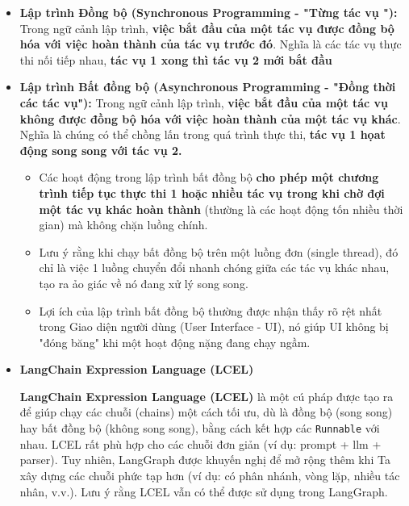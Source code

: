 \documentclass[11pt]{article}
\begin{document}
\begin{itemize}
\begin{boxC}
        \begin{itemize}
            \item \textbf{Lập trình Đồng bộ (Synchronous Programming - "Từng tác vụ "):} Trong ngữ cảnh lập trình, \textbf{việc bắt đầu của một tác vụ được đồng bộ hóa với việc hoàn thành của tác vụ trước đó}. Nghĩa là các tác vụ thực thi nối tiếp nhau,  \textbf{tác vụ 1 xong thì tác vụ 2 mới bắt đầu}

            \item \textbf{Lập trình Bất đồng bộ (Asynchronous Programming - "Đồng thời các tác vụ"):} Trong ngữ cảnh lập trình, \textbf{việc bắt đầu của một tác vụ không được đồng bộ hóa với việc hoàn thành của một tác vụ khác}. Nghĩa là chúng có thể chồng lấn trong quá trình thực thi, \textbf{tác vụ 1 họat động song song với tác vụ 2.}
            \begin{itemize}
                \item Các hoạt động trong lập trình bất đồng bộ \textbf{cho phép một chương trình tiếp tục thực thi 1 hoặc nhiều tác vụ trong khi chờ đợi một tác vụ khác hoàn thành} (thường là các hoạt động tốn nhiều thời gian) mà không chặn luồng chính.
                \item Lưu ý rằng khi chạy bất đồng bộ trên một luồng đơn (single thread), đó chỉ là việc 1 luồng chuyển đổi nhanh chóng giữa các tác vụ khác nhau, tạo ra ảo giác về nó đang xử lý song song.
                \item Lợi ích của lập trình bất đồng bộ thường được nhận thấy rõ rệt nhất trong Giao diện người dùng (User Interface - UI), nó giúp UI không bị "đóng băng" khi một hoạt động nặng đang chạy ngầm.
            \end{itemize}

	\item \textbf{LangChain Expression Language (LCEL)}
	\begin{boxC}
		\textbf{LangChain Expression Language (LCEL)} là một cú pháp được tạo ra để giúp chạy các chuỗi (chains) một cách tối ưu, dù là đồng bộ (song song) hay bất đồng bộ (không song song), bằng cách kết hợp các \texttt{Runnable} với nhau.
		LCEL rất phù hợp cho các chuỗi đơn giản (ví dụ: prompt + llm + parser). Tuy nhiên, LangGraph được khuyến nghị để mở rộng thêm khi Ta xây dựng các chuỗi phức tạp hơn (ví dụ: có phân nhánh, vòng lặp, nhiều tác nhân, v.v.). Lưu ý rằng LCEL vẫn có thể được sử dụng trong LangGraph.
	\end{boxC}

        \end{itemize}
    \end{boxC}
\end{itemize}
\newpage
\end{document}
